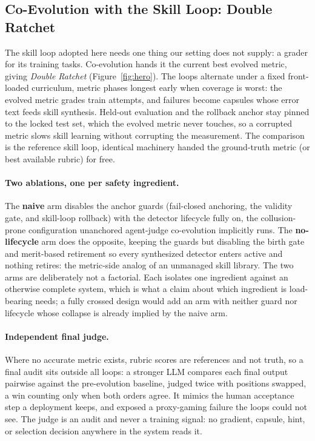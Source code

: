\documentclass[letterpaper]{article} %
\begin{document}
\subsection{Co-Evolution with the Skill Loop: Double Ratchet}

The skill loop adopted here \citep{zhang2026ratchet} needs one thing our setting does not supply: a grader for its training tasks. Co-evolution hands it the current best evolved metric, giving \emph{Double Ratchet} (Figure~\ref{fig:hero}). The loops alternate under a fixed front-loaded curriculum, metric phases longest early when coverage is worst: the evolved metric grades train attempts, and failures become capsules whose error text feeds skill synthesis. Held-out evaluation and the rollback anchor stay pinned to the locked test set, which the evolved metric never touches, so a corrupted metric slows skill learning without corrupting the measurement. The comparison is the reference skill loop, identical machinery handed the ground-truth metric (or best available rubric) for free.

\paragraph{Two ablations, one per safety ingredient.}
The \textbf{naive} arm disables the anchor guards (fail-closed anchoring, the validity gate, and skill-loop rollback) with the detector lifecycle fully on, the collusion-prone configuration unanchored agent-judge co-evolution implicitly runs. The \textbf{no-lifecycle} arm does the opposite, keeping the guards but disabling the birth gate and merit-based retirement so every synthesized detector enters active and nothing retires: the metric-side analog of an unmanaged skill library. The two arms are deliberately not a factorial. Each isolates one ingredient against an otherwise complete system, which is what a claim about which ingredient is load-bearing needs; a fully crossed design would add an arm with neither guard nor lifecycle whose collapse is already implied by the naive arm.

\paragraph{Independent final judge.}
Where no accurate metric exists, rubric scores are references and not truth, so a final audit sits outside all loops: a stronger LLM compares each final output pairwise against the pre-evolution baseline, judged twice with positions swapped, a win counting only when both orders agree. It mimics the human acceptance step a deployment keeps, and exposed a proxy-gaming failure the loops could not see. The judge is an audit and never a training signal: no gradient, capsule, hint, or selection decision anywhere in the system reads it.
\end{document}
